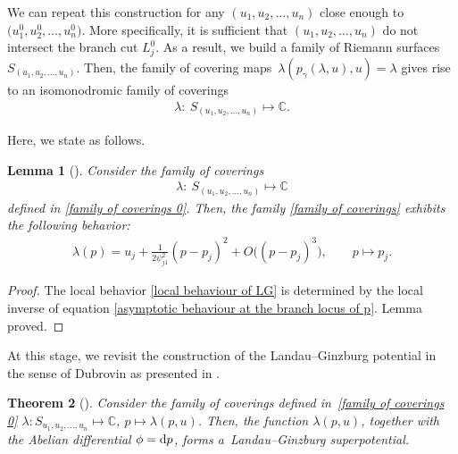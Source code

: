 \documentclass[pdftex]{sigma}
\numberwithin{equation}{section}
\newtheorem{Theorem}{Theorem}[section]
\newtheorem{Lemma}[Theorem]{Lemma}
\begin{document}
 We can repeat this construction for any $(u_1,u_2,\dots,u_n)$ close enough to $\bigl(u_1^0,u_2^0,\dots,u_n^0\bigr)$. More specifically, it is sufficient that $(u_1,u_2,\dots,u_n)$ do not intersect the branch cut $L_j^0$. As a result, we build a family of Riemann surfaces $S_{(u_1,u_2,\dots,u_n)}$. Then, the family of covering maps~${
\lambda(p_{\gamma}(\lambda,u),u)=\lambda}
$
gives rise to an isomonodromic family of coverings
\begin{gather}\label{family of coverings 0}
\lambda \colon\ S_{(u_1,u_2,\dots,u_n)}\mapsto \mathbb{C}.
\end{gather}

Here, we state \cite[Proposition I.1]{B.Dubrovin2} as follows.

\begin{Lemma}[{\cite{B.Dubrovin2}}]\label{main constructive LG lemma}
Consider the family of coverings
\begin{gather}\label{family of coverings}
\lambda \colon\ S_{(u_1,u_2,\dots,u_n)}\mapsto \mathbb{C}
\end{gather}
defined in \eqref{family of coverings 0}. Then, the family \eqref{family of coverings} exhibits the following behavior:
\begin{gather}\label{local behaviour of LG}
\lambda(p)=u_j+ \frac{1}{2\psi^2_{j1}}( p-p_j)^2+O\bigl(( p-p_j)^3\bigr), \qquad p\mapsto p_j.
\end{gather}
\end{Lemma}

\begin{proof}
The local behavior \eqref{local behaviour of LG} is determined by the local inverse of equation \eqref{asymptotic behaviour at the branch locus of p}. Lemma proved.
\end{proof}

At this stage, we revisit the construction of the Landau--Ginzburg potential in the sense of Dubrovin as presented in \cite[Theorem~5.3]{B.Dubrovin3}.

\begin{Theorem}[{\cite{B.Dubrovin3}}]\label{Dubrovin superpotential theorem}
Consider the family of coverings defined in~\eqref{family of coverings 0}
$
\lambda \colon S_{u_1,u_2,\dots,u_n}\mapsto \mathbb{C}$, $ p\mapsto \lambda(p,u)$.
Then, the function $\lambda(p,u)$, together with the Abelian differential $\phi={\rm d}p$, forms a~Landau--Ginzburg superpotential.
\end{Theorem}
\end{document}
